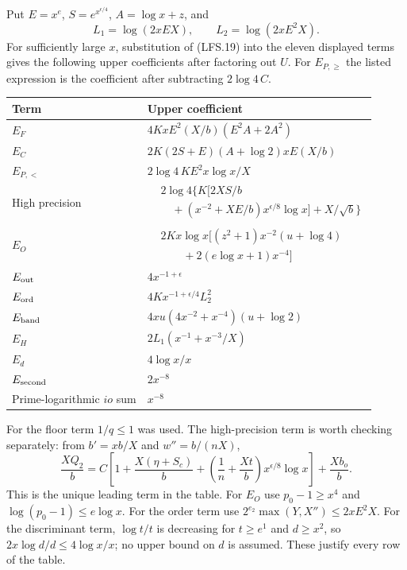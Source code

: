 Put $E=x^e$, $S=e^{x^{\epsilon/4}}$, $A=\log x+z$, and
\[
 L_1=\log(2xEX),\qquad L_2=\log(2xE^2X).
\]
For sufficiently large $x$, substitution of (LFS.19) into the
eleven displayed terms gives the following upper coefficients
after factoring out $U$.  For $E_{P,\ge}$ the listed expression
is the coefficient after subtracting $2\log4\,C$.
\begin{center}\small
\begin{tabular}{p{}p{}}
Term & Upper coefficient\\\hline
$E_F$ & $4KxE^2(X/b)(E^2A+2A^2)$\\
$E_C$ & $2K(2S+E)(A+\log2)xE(X/b)$\\
$E_{P,<}$ & $2\log4\,KE^2x\log x/X$\\
High precision
 & $\begin{aligned}
 &2\log4\{K[2XS/b\\
 &\quad{}+(x^{-2}+XE/b)x^{\epsilon/8}\log x]+X/\sqrt b\}
 \end{aligned}$\\
$E_O$ & $\begin{aligned}
 &2Kx\log x[(z^2+1)x^{-2}(u+\log4)\\
 &\qquad{}+2(e\log x+1)x^{-4}]
 \end{aligned}$\\
$E_{\rm out}$ & $4x^{-1+\epsilon}$\\
$E_{\rm ord}$ & $4Kx^{-1+\epsilon/4}L_2^2$\\
$E_{\rm band}$ & $4xu(4x^{-2}+x^{-4})(u+\log2)$\\
$E_H$ & $2L_1(x^{-1}+x^{-3}/X)$\\
$E_d$ & $4\log x/x$\\
$E_{\rm second}$ & $2x^{-8}$\\
Prime-logarithmic $io$ sum & $x^{-8}$
\end{tabular}
\end{center}
For the floor term $1/q\le1$ was used.  The high-precision
term is worth checking separately: from $b'=xb/X$ and
$w''=b/(nX)$,
\[
 \frac{XQ_2}{b}
 =C\left[1+\frac{X(\eta+S_c)}b
       +\left(\frac1n+\frac{Xt}b\right)
                         x^{\epsilon/8}\log x\right]
        +\frac{Xb_o}b.                                    \tag{LFS.21}
\]
This is the unique leading term in the table.
For $E_O$ use $p_0-1\ge x^4$ and
$\log(p_0-1)\le e\log x$.  For the order term use
$2^{e_2}\max(Y,X'')\le2xE^2X$.  For the discriminant term,
$\log t/t$ is decreasing for $t\ge e^1$ and $d\ge x^2$,
so $2x\log d/d\le4\log x/x$; no upper bound on $d$ is
assumed.  These justify every row of the table.

